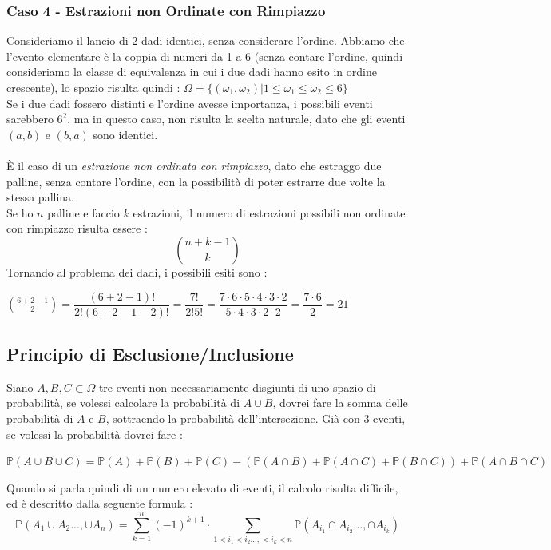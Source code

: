 \documentclass[12pt, letterpaper]{article}
\begin{document}
\subsubsection{Caso 4 - Estrazioni non Ordinate con Rimpiazzo}
\normalsize Consideriamo il lancio di 2 dadi identici, senza considerare l'ordine. Abbiamo che l'evento elementare 
è la coppia di numeri da 1 a 6 (senza contare l'ordine, quindi consideriamo la classe di equivalenza 
in cui i due dadi hanno esito in ordine crescente), lo spazio risulta quindi : \(\Omega=\{(\omega_1,\omega_2)|1\le\omega_1\le\omega_2\le 6\}\)
\\Se i due dadi fossero distinti e l'ordine avesse importanza, i possibili eventi sarebbero \(6^2\), ma in questo caso, 
non risulta la scelta naturale, dato che gli eventi \((a,b)\) e \((b,a)\) sono identici.\\\hphantom{.}\\ È il caso di un \textit{estrazione
non ordinata con rimpiazzo}, dato che estraggo due palline, senza contare l'ordine, con la possibilità di poter 
estrarre due volte la stessa pallina.\\
Se ho \(n\) palline e faccio \(k\) estrazioni, il numero di estrazioni possibili non ordinate con rimpiazzo 
risulta essere : \begin{equation}
    \binom{n+k-1}{k}
\end{equation}
Tornando al problema dei dadi, i possibili esiti sono : \begin{center}
    \(
        \displaystyle\binom{6+2-1}{2}=\dfrac{(6+2-1)!}{2!(6+2-1-2)!}=\dfrac{7!}{2!5!}=\dfrac{7\cdot6\cdot5\cdot4\cdot3\cdot2}{5\cdot4\cdot3\cdot2\cdot2}=\dfrac{7\cdot6}{2}=21
    \)
\end{center}
\subsection{Principio di Esclusione/Inclusione}
Siano \(A,B,C\subset \Omega\) tre eventi non necessariamente disgiunti di uno spazio di probabilità, se volessi 
calcolare la probabilità di \(A\cup B\), dovrei fare la somma delle probabilità di \(A\) e \(B\), sottraendo la 
probabilità dell'intersezione. Già con 3 eventi, se volessi la probabilità dovrei fare :
\begin{center}
    \(\mathbb{P}(A\cup B\cup C)=\mathbb{P}(A)+\mathbb{P}(B)+\mathbb{P}(C)-(\mathbb{P}(A\cap B)+\mathbb{P}(A\cap C)+\mathbb{P}(B\cap C))+\mathbb{P}(A\cap B \cap C)\)
\end{center}
Quando si parla quindi di un numero elevato di eventi, il calcolo risulta difficile, ed è descritto dalla seguente formula :
\begin{equation}
    \mathbb{P}(A_1\cup A_2...,\cup A_n)=\sum_{k=1}^n(-1)^{k+1}\cdot\sum_{1<i_1<i_2...,<i_k<n}\mathbb{P}(A_{i_1}\cap A_{i_2}...,\cap A_{i_k})
\end{equation}
\end{document}
